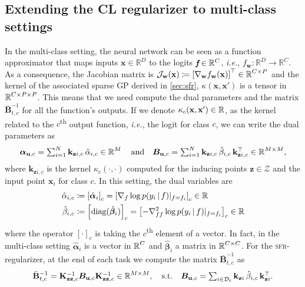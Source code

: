 \documentclass{article}
\makeatletter
\newcommand{\ie}{\textit{i.e.\@}\xspace}
\newcommand{\our}{\textsc{sfr}\xspace}
\newcommand{\dataset}{\ensuremath{\mathcal{D}}}
\newcommand{\inputDomain}{\ensuremath{\mathbb{R}^{D}}}
\newcommand{\outputDomain}{\ensuremath{\mathbb{R}^{C}}}
\newcommand{\weights}{\ensuremath{\mathbf{w}}}
\newcommand{\mathbold}[1]{\bm{#1}}
\newcommand{\mbf}[1]{\mathbf{#1}}
\renewcommand{\mid}{\,|\,}
\newcommand{\MB}{\mbf{B}}
\newcommand{\T}{\top}
\newcommand{\valpha}[0]{\mathbold{\alpha}}
\newcommand{\vbeta}[0]{\mathbold{\beta}}
\newcommand{\MBeta}[0]{\mathbold{B}}
\newcommand{\vz}{\mbf{z}}
\newcommand{\vu}{\mbf{u}}
\newcommand{\vx}{\mbf{x}}
\newcommand{\Jac}[2]{\mathcal{J}_{#1}(#2)}
\newcommand{\MKzzc}{\mbf{K}_{\mbf{z}\mbf{z}, c}}
\newcommand{\vkzi}{\mbf{k}_{\mbf{z}i}}
\newcommand{\vkzic}{\mbf{k}_{\mbf{z}i,c}}
\makeatother
\begin{document}
\subsection{Extending the CL regularizer to multi-class settings} 
\label{sec:cl_multioutput}
In the multi-class setting, the neural network can be seen as a function approximator that maps inputs $\vx \in \inputDomain$ to  the logits $\textit{\textbf{f}} \in \outputDomain$, \ie, $f_\mathbf{w}: \inputDomain \to \outputDomain$. As a consequence, the Jacobian matrix is $\Jac{\weights}{\vx} \coloneqq \left[ \nabla_\weights f_\weights(\vx)\right]^\top \in \R^{C \times P}$ and the kernel of the associated sparse GP derived in \cref{sec:sfr}, $\kappa(\vx, \vx')$ is a tensor in $\operatorname{\mathbb{R}}^{C \times P \times P}$. This means that we need compute the dual parameters and the matrix $\bar{\MB}^{-1}_{t, c}$ for all the function's outputs. If we denote $\kappa_c(\vx, \vx') \in \R$, as the kernel related to the $c$\textsuperscript{th} output function, \ie, the logit for class $c$, we can write the dual parameters as
%
\begin{equation} \textstyle
  \valpha_{\vu, c}  =  \sum_{i=1}^N  \vkzic \, \hat{\alpha}_{i, c} \in \R^{M}
  \quad \text{and} \quad
  \MBeta_{\vu, c} =  \sum_{i=1}^N \vkzic \,\hat{\beta}_{i, c} \, \vkzic^{\T} \in \R^{M \times M} ,    
\label{eq:dual_sparse}
\end{equation}
%
where $\vkzic$ is the kernel $\kappa_c(\cdot, \cdot)$ computed for the inducing points $\vz \in \mathcal{Z}$ and the input point $\vx_i$ for class $c$. In this setting, the dual variables are
\begin{equation}
\begin{aligned}
  \hat{\alpha}_{i,c} &\coloneqq  \left[\hat{\valpha}_{i}\right]_c = \left[\nabla_{f}\log p(y_i \mid f) |_{f=f_i} \right]_c \in \R\\
  \hat{\beta}_{i,c} &\coloneqq \left[\textrm{diag}(\hat{\vbeta}_i)\right]_c = \left[ - \nabla^2_{ff}\log p(y_i \mid f) |_{f=f_i} \right]_c \in \R 
\end{aligned}
\end{equation}
where the operator $[ \cdot ]_c$ is taking the $c$\textsuperscript{th} element of a vector. In fact, in the multi-class setting $\hat{\valpha}_{i}$ is a vector in $\operatorname{\mathbb{R}}^C$ and $\hat{\vbeta}_{i}$ a matrix in $\operatorname{\mathbb{R}}^{C \times C}$.
For the \our-regularizer, at the end of each task we compute the matrix $\bar{\MB}^{-1}_{t, c}$ as 
\begin{equation}\textstyle
 	\bar{\MB}^{-1}_{t, c} = \MKzzc^{-1} \MBeta_{\vu, c} \MKzzc^{-1} \in \R^{M \times M}, 
 	\quad \text{s.t.} \quad
 	\MBeta_{\vu, c} =  \sum_{i \in \dataset_t} \vkzi \,\hat{\beta}_{i, c} \, \vkzi^{\T}.
\end{equation}
\end{document}
